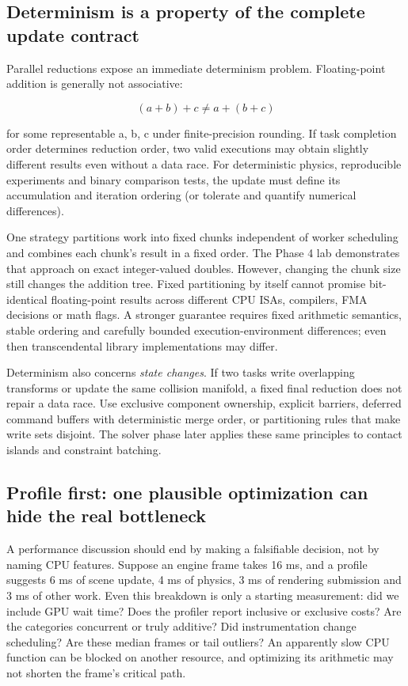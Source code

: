 \subsection{Determinism is a property of the complete update contract}\label{05-engine-i-ch007-determinism-is-a-property-of-the-complete-update-contract}

Parallel reductions expose an immediate determinism problem. Floating-point addition is generally not associative:

\[
(a+b)+c\neq a+(b+c)
\]

for some representable a, b, c under finite-precision rounding. If task completion order determines reduction order, two valid executions may obtain slightly different results even without a data race. For deterministic physics, reproducible experiments and binary comparison tests, the update must define its accumulation and iteration ordering (or tolerate and quantify numerical differences).

One strategy partitions work into fixed chunks independent of worker scheduling and combines each chunk's result in a fixed order. The Phase 4 lab demonstrates that approach on exact integer-valued doubles. However, changing the chunk size still changes the addition tree. Fixed partitioning by itself cannot promise bit-identical floating-point results across different CPU ISAs, compilers, FMA decisions or math flags. A stronger guarantee requires fixed arithmetic semantics, stable ordering and carefully bounded execution-environment differences; even then transcendental library implementations may differ.

Determinism also concerns \emph{state changes}. If two tasks write overlapping transforms or update the same collision manifold, a fixed final reduction does not repair a data race. Use exclusive component ownership, explicit barriers, deferred command buffers with deterministic merge order, or partitioning rules that make write sets disjoint. The solver phase later applies these same principles to contact islands and constraint batching.

\subsection{Profile first: one plausible optimization can hide the real bottleneck}\label{05-engine-i-ch007-profile-first-one-plausible-optimization-can-hide-the-real-bottleneck}

A performance discussion should end by making a falsifiable decision, not by naming CPU features. Suppose an engine frame takes 16 ms, and a profile suggests 6 ms of scene update, 4 ms of physics, 3 ms of rendering submission and 3 ms of other work. Even this breakdown is only a starting measurement: did we include GPU wait time? Does the profiler report inclusive or exclusive costs? Are the categories concurrent or truly additive? Did instrumentation change scheduling? Are these median frames or tail outliers? An apparently slow CPU function can be blocked on another resource, and optimizing its arithmetic may not shorten the frame's critical path.

